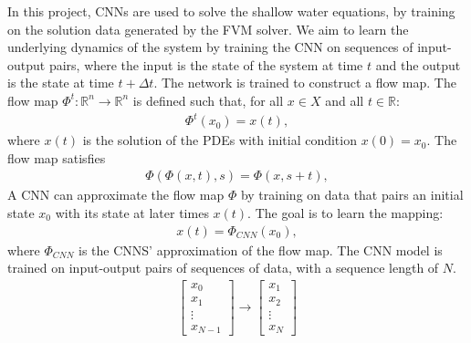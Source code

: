 In this project, CNNs are used to solve the shallow water equations, by training on the solution data generated by the FVM solver.
We aim to learn the underlying dynamics of the system by training the CNN on sequences of input-output pairs, where the input is the state of the system at time $t$ and the output is the state at time $t + \Delta t$.
The network is trained to construct a flow map. %
The flow map $\Phi^t: \mathbb{R}^n \rightarrow \mathbb{R}^n$ is defined such that, for all $x \in X$ and all $t \in \mathbb{R}$:
\begin{align*}
    \Phi^t(x_0) =  x(t),
\end{align*}
where $x(t)$ is the solution of the PDEs with initial condition $x(0) = x_0$.
The flow map satisfies
\begin{align*}
    \Phi(\Phi (x, t), s) = \Phi(x, s + t),
\end{align*}
A CNN can approximate the flow map $\Phi$ by training on data that pairs an initial state $x_0$ with its state at later times $x(t)$.
The goal is to learn the mapping:
\begin{align*}
    x(t) = \Phi_{CNN} (x_0), 
\end{align*}
where $\Phi_{CNN}$ is the CNNS' approximation of the flow map.
The CNN model is trained on input-output pairs of sequences of data, with a sequence length of $N$.
\begin{align*}
    \begin{bmatrix}
        x_0 \\ x_1 \\ \vdots \\ x_{N-1}
    \end{bmatrix}
    \to
    \begin{bmatrix}
        x_1 \\ x_2 \\ \vdots \\ x_{N}
    \end{bmatrix}
\end{align*}


